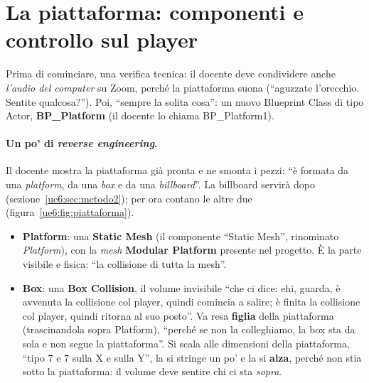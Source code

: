 \section{La piattaforma: componenti e controllo sul player}
\label{ue6:sec:piattaforma}

Prima di cominciare, una verifica tecnica: il docente deve condividere anche
\emph{l'audio del computer} su Zoom, perché la piattaforma suona (``aguzzate
l'orecchio. Sentite qualcosa?''). Poi, ``sempre la solita cosa'': un nuovo Blueprint
Class di tipo Actor, \textbf{BP\_Platform} (il docente lo chiama BP\_Platform1).

\paragraph{Un po' di \emph{reverse engineering}.} Il docente mostra la piattaforma già
pronta e ne smonta i pezzi: ``è formata da una \emph{platform}, da una \emph{box} e da
una \emph{billboard}''. La billboard servirà dopo (sezione~\ref{ue6:sec:metodo2}); per
ora contano le altre due (figura~\ref{ue6:fig:piattaforma}).
\begin{itemize}
  \item \textbf{Platform}: una \textbf{Static Mesh} (il componente ``Static Mesh'',
        rinominato \emph{Platform}), con la \emph{mesh} \textbf{Modular Platform}
        presente nel progetto. È la parte visibile e fisica: ``la collisione di tutta la
        mesh''.
  \item \textbf{Box}: una \textbf{Box Collision}, il volume invisibile ``che ci dice:
        ehi, guarda, è avvenuta la collisione col player, quindi comincia a salire; è
        finita la collisione col player, quindi ritorna al suo posto''. Va resa
        \textbf{figlia} della piattaforma (trascinandola sopra Platform), ``perché se
        non la colleghiamo, la box sta da sola e non segue la piattaforma''. Si scala
        alle dimensioni della piattaforma, ``tipo 7 e 7 sulla X e sulla Y'', la si
        stringe un po' e la si \textbf{alza}, perché non stia sotto la piattaforma: il
        volume deve sentire chi ci sta \emph{sopra}.
\end{itemize}

